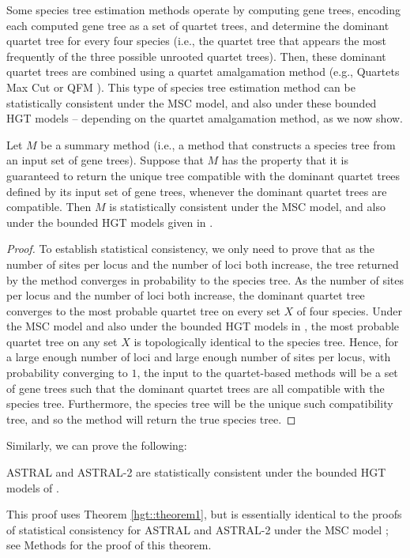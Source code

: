 Some  species tree estimation methods 
operate by computing gene trees, encoding each computed
gene tree as a set of quartet trees, and determine the
dominant quartet tree for every four species (i.e., the
quartet tree that appears the most frequently of the 
three possible unrooted quartet trees).
Then, these 
dominant quartet trees are combined using
a quartet amalgamation method
(e.g., Quartets Max Cut \cite{qmc} or QFM \cite{reaz2014accurate}).
This type of species tree estimation method 
can be statistically consistent under
the MSC model, and also under these bounded HGT models --
depending on the quartet amalgamation method, as we now show.
\begin{theorem}
\label{hgt::thm:astral-stat-hgt}
Let $M$ be a summary method  (i.e., a method that
constructs a species tree from an input set of gene trees).
Suppose that $M$ has the property that
it is guaranteed to return the unique tree
compatible with the dominant quartet trees defined
by its input set of gene trees, whenever
the dominant quartet trees are compatible.
Then $M$ is
statistically consistent under the 
MSC model, and also 
under the bounded HGT models 
given in \cite{RochSnir}.
\end{theorem}
\begin{proof}
To establish statistical consistency, we only need to
prove that as the number of sites per locus and the number of loci
both increase, the tree returned by the method converges
in probability
to the species tree. 
As the number of sites per locus and the number of
loci both increase, the dominant quartet tree converges to the
most probable quartet tree on every set $X$ of four species. 
Under the MSC model and also
under the bounded HGT models in \cite{RochSnir},
the most probable quartet tree on any set $X$ is
topologically identical to the species tree.
Hence, for a large enough number of loci and large enough
number of sites per locus, with probability converging to $1$, the
input to the quartet-based methods 
will be a set of gene trees such that the dominant
quartet trees are all compatible with the species tree.
Furthermore, the species tree will be the
unique such compatibility tree, and so
the method will return the true species tree.
\end{proof}


Similarly, we can prove the following:
\begin{theorem}
ASTRAL and ASTRAL-2  are statistically consistent under the bounded
HGT models of \cite{RochSnir}. 
\label{hgt::theorem-corollary}
\end{theorem}
This proof uses Theorem \ref{hgt::theorem1}, 
but is essentially identical to the proofs of
statistical consistency for ASTRAL and ASTRAL-2 under
the MSC model \cite{Astral2}; see Methods for
the proof of this theorem.


